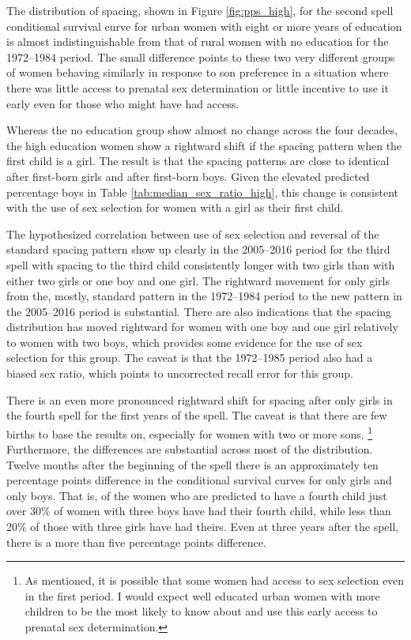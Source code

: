 \documentclass[12pt,letterpaper]{article}
\begin{document}
The distribution of spacing, shown in Figure \ref{fig:pps_high}, for the second spell 
conditional survival curve for urban women with eight or more years of education 
is almost indistinguishable from that of rural women with no education 
for the 1972--1984 period.
The small difference points to these two very different groups of women behaving similarly
in response to son preference in a situation where there was little access to
prenatal sex determination or little incentive to use it early even for those 
who might have had access.

Whereas the no education group show almost no change across the four decades,
the high education women show a rightward shift if the spacing pattern when
the first child is a girl.
The result is that the spacing patterns are close to identical after first-born 
girls and after first-born boys.
Given the elevated predicted percentage boys in Table \ref{tab:median_sex_ratio_high},
this change is consistent with the use of sex selection for women with a girl 
as their first child.

The hypothesized correlation between use of sex selection and reversal of 
the standard spacing pattern show up clearly in the 2005--2016 period for the 
third spell with spacing to the third child consistently longer with two girls 
than with either two girls or one boy and one girl.
The rightward movement for only girls from the, mostly, standard pattern in 
the 1972--1984 period to the new pattern in the 2005--2016 period is substantial.
There are also indications that the spacing distribution has moved rightward
for women with one boy and one girl relatively to women with two boys, which
provides some evidence for the use of sex selection for this group.
The caveat is that the 1972--1985 period also had a biased sex ratio, which
points to uncorrected recall error for this group.

There is an even more pronounced rightward shift for spacing after only
girls in the fourth spell for the first years of the spell. 
The caveat is that there are few births to base the results on,
especially for women with two or more sons.%
\footnote{
As mentioned, it is possible that some women had access to sex selection even
in the first period.
I would expect well educated urban women with more children to be the
most likely to know about and use this early access to prenatal sex determination.
}
Furthermore, the differences are substantial across most of the distribution.
Twelve months after the beginning of the spell there is an approximately ten 
percentage points difference in the conditional survival curves for only girls
and only boys.
That is, of the women who are predicted to have a fourth child just over 30\%
of women with three boys have had their fourth child, while less than 20\% of
those with three girls have had theirs.
Even at three years after the spell, there is a more than five percentage
points difference.
\end{document}
